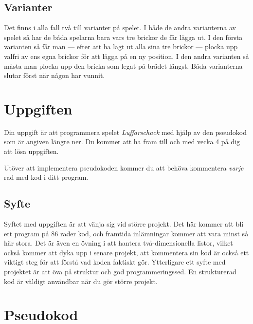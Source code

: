 \documentclass[11pt, a4paper]{article} %
\begin{document}
\subsection{Varianter}

Det finns i alla fall två till varianter på spelet. I både de andra varianterna av spelet så har de båda spelarna bara vars tre brickor de får lägga ut. I den första varianten så får man --- efter att ha lagt ut alla sina tre brickor --- plocka upp valfri av ens egna brickor för att lägga på en ny position. I den andra varianten så måsta man plocka upp den bricka som legat på brädet längst. Båda varianterna slutar först när någon har vunnit.



\section{Uppgiften}

Din uppgift är att programmera spelet \textit{Luffarschack} med hjälp av den pseudokod som är angiven längre ner. Du kommer att ha fram till och med vecka 4 på dig att lösa uppgiften.

Utöver att implementera pseudokoden kommer du att behöva kommentera \textit{varje} rad med kod i ditt program.

\subsection{Syfte}

Syftet med uppgiften är att vänja sig vid större projekt. Det här kommer att bli ett program på 86 rader kod, och framtida inlämningar kommer att vara minst så här stora. Det är även en övning i att hantera två-dimensionella listor, vilket också kommer att dyka upp i senare projekt, att kommentera sin kod är också ett viktigt steg för att förstå vad koden faktiskt gör. Ytterligare ett syfte med projektet är att öva på struktur och god programmeringssed. En strukturerad kod är väldigt användbar när du gör större projekt.

\section{Pseudokod}
\end{document}
